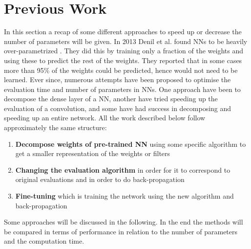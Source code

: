 \section{Previous Work} \label{tex:previous_work}
In this section a recap of some different approaches to speed up or decrease the number of parameters will be given. In 2013 Denil et al. found NNs to be heavily over-parametrized \cite{Denil2013}. They did this by training only a fraction of the weights and using these to predict the rest of the weights. They reported that in some cases more than 95\% of the weights could be predicted, hence would not need to be learned. Ever since, numerous attempts have been proposed to optimise the evaluation time and number of parameters in NNs. One approach have been to decompose the dense layer of a NN, another have tried speeding up the evaluation of a convolution, and some have had success in decomposing and speeding up an entire network. All the work described below follow approximately the same structure:

\begin{enumerate}
    \item \textbf{Decompose weights of pre-trained NN} using some specific algorithm to get a smaller representation of the weights or filters
    \item \textbf{Changing the evaluation algorithm} in order for it to correspond to original evaluations and in order to do back-propagation
    \item \textbf{Fine-tuning} which is training the network using the new algorithm and back-propagation 
\end{enumerate}
Some approaches will be discussed in the following. In the end the methods will be compared in terms of performance in relation to the number of parameters and the computation time.

